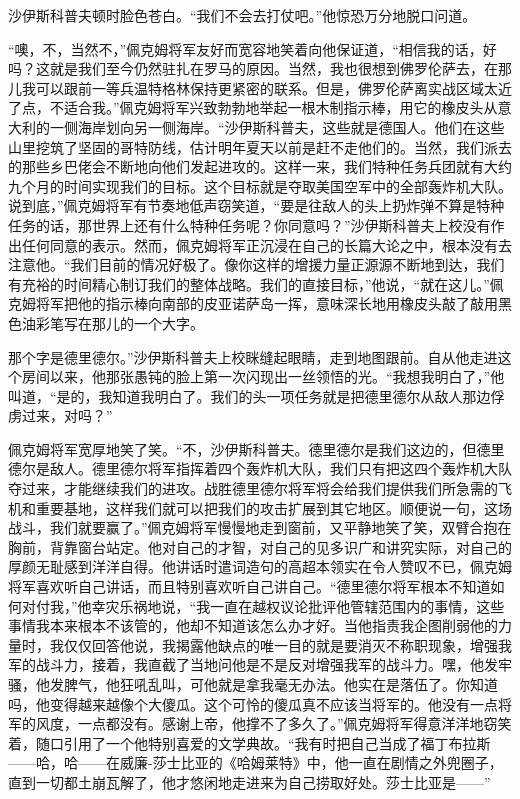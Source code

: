    沙伊斯科普夫顿时脸色苍白。“我们不会去打仗吧。”他惊恐万分地脱口问道。

    “噢，不，当然不，”佩克姆将军友好而宽容地笑着向他保证道，“相信我的话，好吗？这就是我们至今仍然驻扎在罗马的原因。当然，我也很想到佛罗伦萨去，在那儿我可以跟前一等兵温特格林保持更紧密的联系。但是，佛罗伦萨离实战区域太近了点，不适合我。”佩克姆将军兴致勃勃地举起一根木制指示棒，用它的橡皮头从意大利的一侧海岸划向另一侧海岸。“沙伊斯科普夫，这些就是德国人。他们在这些山里挖筑了坚固的哥特防线，估计明年夏天以前是赶不走他们的。当然，我们派去的那些乡巴佬会不断地向他们发起进攻的。这样一来，我们特种任务兵团就有大约九个月的时间实现我们的目标。这个目标就是夺取美国空军中的全部轰炸机大队。说到底，”佩克姆将军有节奏地低声窃笑道，“要是往敌人的头上扔炸弹不算是特种任务的话，那世界上还有什么特种任务呢？你同意吗？”沙伊斯科普夫上校没有作出任何同意的表示。然而，佩克姆将军正沉浸在自己的长篇大论之中，根本没有去注意他。“我们目前的情况好极了。像你这样的增援力量正源源不断地到达，我们有充裕的时间精心制订我们的整体战略。我们的直接目标，”他说，“就在这儿。”佩克姆将军把他的指示棒向南部的皮亚诺萨岛一挥，意味深长地用橡皮头敲了敲用黑色油彩笔写在那儿的一个大字。

    那个字是德里德尔。”沙伊斯科普夫上校眯缝起眼睛，走到地图跟前。自从他走进这个房间以来，他那张愚钝的脸上第一次闪现出一丝领悟的光。“我想我明白了，”他叫道，“是的，我知道我明白了。我们的头一项任务就是把德里德尔从敌人那边俘虏过来，对吗？”
 


    佩克姆将军宽厚地笑了笑。“不，沙伊斯科普夫。德里德尔是我们这边的，但德里德尔是敌人。德里德尔将军指挥着四个轰炸机大队，我们只有把这四个轰炸机大队夺过来，才能继续我们的进攻。战胜德里德尔将军将会给我们提供我们所急需的飞机和重要基地，这样我们就可以把我们的攻击扩展到其它地区。顺便说一句，这场战斗，我们就要赢了。”佩克姆将军慢慢地走到窗前，又平静地笑了笑，双臂合抱在胸前，背靠窗台站定。他对自己的才智，对自己的见多识广和讲究实际，对自己的厚颜无耻感到洋洋自得。他讲话时遣词造句的高超本领实在令人赞叹不已，佩克姆将军喜欢听自己讲话，而且特别喜欢听自己讲自己。“德里德尔将军根本不知道如何对付我，”他幸灾乐祸地说，“我一直在越权议论批评他管辖范围内的事情，这些事情我本来根本不该管的，他却不知道该怎么办才好。当他指责我企图削弱他的力量时，我仅仅回答他说，我揭露他缺点的唯一目的就是要消灭不称职现象，增强我军的战斗力，接着，我直截了当地问他是不是反对增强我军的战斗力。嘿，他发牢骚，他发脾气，他狂吼乱叫，可他就是拿我毫无办法。他实在是落伍了。你知道吗，他变得越来越像个大傻瓜。这个可怜的傻瓜真不应该当将军的。他没有一点将军的风度，一点都没有。感谢上帝，他撑不了多久了。”佩克姆将军得意洋洋地窃笑着，随口引用了一个他特别喜爱的文学典故。“我有时把自己当成了福丁布拉斯——哈，哈——在威廉-莎士比亚的《哈姆莱特》中，他一直在剧情之外兜圈子，直到一切都土崩瓦解了，他才悠闲地走进来为自己捞取好处。莎士比亚是——”

